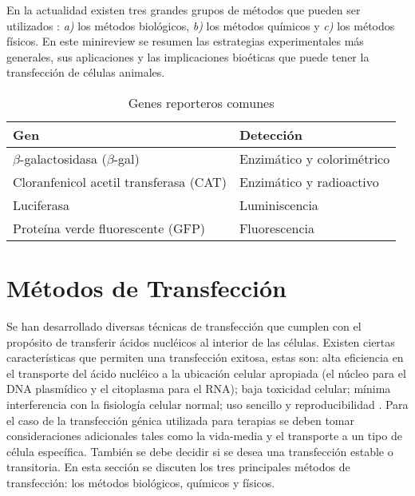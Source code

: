 \documentclass[fleqn,10pt]{SelfArx} %
\begin{document}
En la actualidad existen tres grandes grupos de métodos que pueden ser utilizados \cite{Kim:2010aa}: \textit{a)} los métodos biológicos, \textit{b)} los métodos químicos y \textit{c)} los métodos físicos. En este minireview se resumen las estrategias experimentales más generales, sus aplicaciones y las implicaciones bioéticas que puede tener la transfección de células animales.

\begin{table*}[th!]
\centering
\begin{tabular}{p{8cm} p{4cm}} \toprule
\textbf{Gen} & \textbf{Detección} \\ \hline
$\beta$-galactosidasa ($\beta$-gal) & Enzimático y colorimétrico \\ 
Cloranfenicol acetil transferasa (CAT) & Enzimático y radioactivo \\
Luciferasa & Luminiscencia \\
Proteína verde fluorescente (GFP) & Fluorescencia \\ \bottomrule
\end{tabular}
\caption{Genes reporteros comunes}
\label{Tab:reportero}
\end{table*}

\section{Métodos de Transfección}
Se han desarrollado diversas técnicas de transfección que cumplen con el propósito de transferir ácidos nucléicos al interior de las células. Existen ciertas características que permiten una transfección exitosa, estas son: alta eficiencia en el transporte del ácido nucléico a la ubicación celular apropiada (el núcleo para el DNA plasmídico y el citoplasma para el RNA); baja toxicidad celular; mínima interferencia con la fisiología celular normal; uso sencillo y reproducibilidad \cite{Schenborn}. Para el caso de la transfección génica utilizada para terapias se deben tomar consideraciones adicionales tales como la vida-media y el transporte a un tipo de célula específica. También se debe decidir si se desea una transfección estable o transitoria.  En esta sección se discuten los tres principales métodos de transfección: los métodos biológicos, químicos y físicos.
\end{document}
